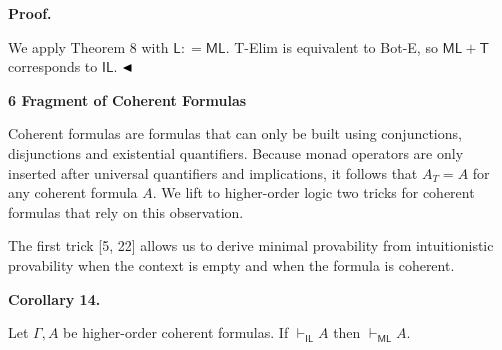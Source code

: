 
 
\par\medskip\noindent\textbf{Proof.}\par
 
 
We apply Theorem 8 with $\mathsf{L}\mathrel{\mathop{:}}=\mathsf{ML}$. T-Elim is equivalent to Bot-E, so $\mathsf{ML}+\mathsf{T}$ corresponds to $\mathsf{IL}$. $\hfill\blacktriangleleft$\par
 
 
 


 
\par\medskip\noindent\textbf{6 Fragment of Coherent Formulas}\par
 
 
Coherent formulas are formulas that can only be built using conjunctions, disjunctions and existential quantifiers. Because monad operators are only inserted after universal quantifiers and implications, it follows that $A_{T}=A$ for any coherent formula $A$. We lift to higher-order logic two tricks for coherent formulas that rely on this observation.\par
 
 
 
The first trick [5, 22] allows us to derive minimal provability from intuitionistic provability when the context is empty and when the formula is coherent.\par
 
 
 
\par\medskip\noindent\textbf{Corollary 14.}\par
 
 
Let $\Gamma,A$ be higher-order coherent formulas. If $\vdash_{\mathsf{IL}}A$ then $\vdash_{\mathsf{ML}}A$.\par
 
 
 
 
